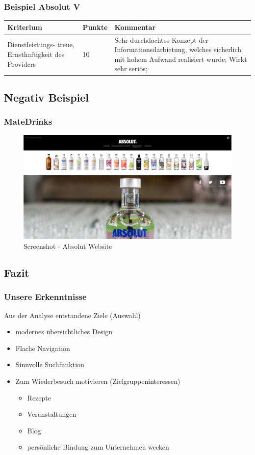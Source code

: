 \begin{frame}\frametitle{Beispiel Absolut V}
	\begin{tabular}{|p{}|l|p{6cm}|}
	\hline
	  Kriterium & Punkte & Kommentar \\ \hline
	  Dienstleistungs- treue, Ernsthaftigkeit des Providers & 10 & Sehr durchdachtes Konzept der Informationsdarbietung, welches sicherlich mit hohem Aufwand realisiert wurde; Wirkt sehr seriös; \\ \hline
 	\end{tabular}
\end{frame}

\subsection{Negativ Beispiel}
\begin{frame}
	\frametitle{MateDrinks}
	\begin{figure}
	\includegraphics[scale=0.2]{bilder/absolut.png}
	\caption[Screenshot - Absolut Vodka]{Screenshot - Absolut Website}
	\label{labelname}
	\end{figure}
\end{frame}

\subsection{Fazit}
\begin{frame}
	\frametitle{Unsere Erkenntnisse}
	Aus der Analyse entstandene Ziele (Auswahl)
	\begin{itemize}
		\item modernes übersichtliches Design %
		\item Flache Navigation
		\item Sinnvolle Suchfunktion %
		\item Zum Wiederbesuch motivieren (Zielgruppeninteressen)
			\begin{itemize}
				\item Rezepte
				\item Veranstaltungen
				\item Blog
				\item persönliche Bindung zum Unternehmen wecken
			\end{itemize}
	\end{itemize}
\end{frame}

